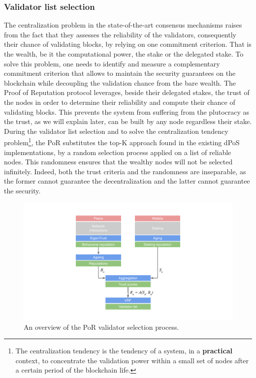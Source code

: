 \documentclass[]{article}
\begin{document}
\subsubsection{Validator list selection}
\label{sec:components:valsel}
The centralization problem in the state-of-the-art consensus mechanisms raises from the fact that they assesses the reliability of the validators, consequently their chance of validating blocks, by relying on one commitment criterion. That is the wealth, be it the computational power, the stake or the delegated stake. To solve this problem, one needs to identify and measure a complementary commitment criterion that allows to maintain the security guarantees on the blockchain while decoupling the validation chance from the bare wealth. The Proof of Reputation protocol leverages, beside their delegated stakes, the trust of the nodes in order to determine their reliability and compute their chance of validating blocks. This prevents the system from suffering from the plutocracy as the trust, as we will explain later, can be built by any node regardless their stake. During the validator list selection and to solve the centralization tendency problem\footnote{The centralization tendency is the tendency of a system, in a \textbf{practical} context, to concentrate the validation power within a small set of nodes after a certain period of the blockchain life.}, the PoR substitutes the top-K approach found in the existing dPoS implementations, by a random selection process applied on a list of reliable nodes. This randomness ensures that the wealthy nodes will not be selected infinitely. Indeed, both the trust criteria and the randomness are inseparable, as the former cannot guarantee the decentralization and the latter cannot guarantee the security.
\begin{figure}[]
\centering
	\includegraphics[width=0.6\linewidth, trim= 6cm 0cm 6cm 1cm, clip]{Figures/Overview.pdf}
	\caption{An overview of the PoR validator selection process.}
	\label{fig:overview}
\end{figure}
\end{document}
